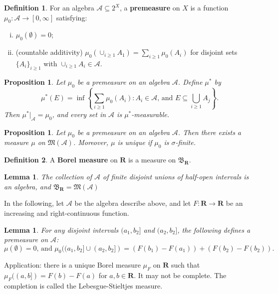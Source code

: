 \documentclass[11pt]{article}
\theoremstyle{definition}
\newtheorem*{defn}{Definition}
\theoremstyle{plain}
\newtheorem{prop}[thm]{Proposition}
\newtheorem{lem}[thm]{Lemma}
\newcommand{\R}{\mathbf{R}}
\begin{document}
\begin{defn}
For an algebra $\mathcal{A}\subseteq2^X$, a \textbf{premeasure} on $X$ is a function $\mu_0:\mathcal{A}\to[0,\infty]$ satisfying:\begin{enumerate}[(i)]
    \item $\mu_0(\emptyset)=0$;
    \item (countable additivity) $\mu_0(\cup_{i\geq1}A_1)=\sum_{i\geq1}\mu_0(A_i)$ for disjoint sets $\{A_i\}_{i\geq1}$ with $\cup_{i\geq1}A_i\in\mathcal{A}$.
\end{enumerate}
\end{defn}

\begin{prop}
Let $\mu_0$ be a premeasure on an algebra $\mathcal{A}$. Define $\mu^\ast$ by
\[\mu^\ast(E)=\inf\left\{\sum_{i\geq1}\mu_0(A_i):A_i\in\mathcal{A}\textrm{, and }E\subseteq\bigcup_{i\geq1}A_j\right\}.\]
Then $\mu^\ast|_\mathcal{A}=\mu_0$, and every set in $\mathcal{A}$ is $\mu^\ast$-measurable.
\end{prop}

\begin{prop}
Let $\mu_0$ be a premeasure on an algebra $\mathcal{A}$. Then there exists a measure $\mu$ on $\mathfrak{M}(\mathcal{A})$. Moreover, $\mu$ is unique if $\mu_0$ is $\sigma$-finite.
\end{prop}

\begin{defn}
A \textbf{Borel measure} on $\R$ is a measure on $\mathfrak{B}_\R$.
\end{defn}

\begin{lem}
The collection of $\mathcal{A}$ of finite disjoint unions of half-open intervals is an algebra, and $\mathfrak{B}_\R=\mathfrak{M}(\mathcal{A})$
\end{lem}

In the following, let $\mathcal{A}$ be the algebra describe above, and let $F:\R\to\R$ be an increasing and right-continuous function.

\begin{lem}
For any disjoint intervals $(a_1,b_2]$ and $(a_2,b_2]$, the following defines a premeasure on $\mathcal{A}$:
\[\mu(\emptyset)=0\textrm{, and }\mu_0((a_1,b_2]\cup(a_2,b_2])=(F(b_1)-F(a_1))+(F(b_2)-F(b_2)).\]
\end{lem}

Application: there is a unique Borel measure $\mu_F$ on $\R$ such that $\mu_F((a,b])=F(b)-F(a)$ for $a,b\in\R$. It may not be complete. The completion is called the Lebesgue-Stieltjes measure.
\end{document}
